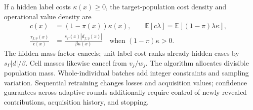 If a hidden label costs $\kappa(x)\geq0$, the target-population cost density and
operational value density are
\begin{align}
 c(x)&=(1-\pi(x))\kappa(x),\qquad
 \mathbb E[c\lambda]=\mathbb E[(1-\pi)\lambda\kappa],\label{eq:c-label-cost}\\
 \frac{\tau_{f,\eta}(x)}{c(x)}
 &=\frac{s_\Gamma(x)|d_{f,\eta}(x)|}{\beta\kappa(x)}
 \quad\text{when }(1-\pi)\kappa>0.\label{eq:c-operational-density}
\end{align}
The hidden-mass factor cancels; unit label cost ranks already-hidden cases by
$s_\Gamma|d|/\beta$. Cell masses likewise cancel from $v_j/w_j$.
The algorithm allocates divisible population mass. Whole-individual batches add
integer constraints and sampling variation. Sequential retraining changes losses
and acquisition values; confidence guarantees across adaptive rounds additionally
require control of newly revealed contributions, acquisition history, and stopping.
